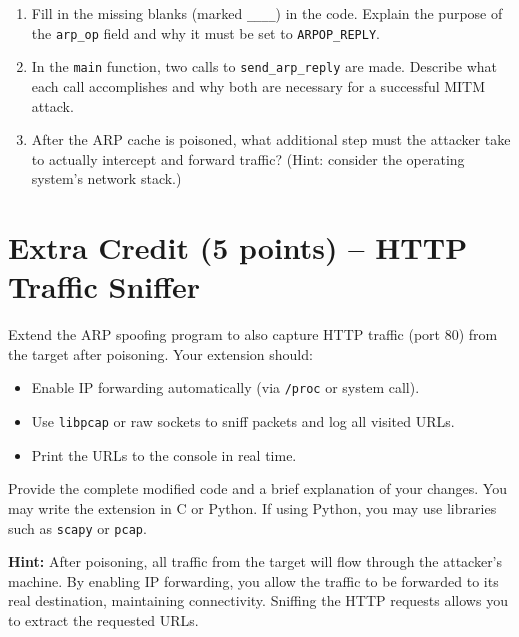 \documentclass[11pt]{article}
\begin{document}
\begin{enumerate}[label=(\alph*)]
    \item Fill in the missing blanks (marked \texttt{\_\_\_\_}) in the code. Explain the purpose of the \texttt{arp\_op} field and why it must be set to \texttt{ARPOP\_REPLY}.

    \item In the \texttt{main} function, two calls to \texttt{send\_arp\_reply} are made. Describe what each call accomplishes and why both are necessary for a successful MITM attack.

    \item After the ARP cache is poisoned, what additional step must the attacker take to actually intercept and forward traffic? (Hint: consider the operating system's network stack.)
\end{enumerate}

\newpage
\section*{Extra Credit (5 points) – HTTP Traffic Sniffer}

Extend the ARP spoofing program to also capture HTTP traffic (port 80) from the target after poisoning. Your extension should:

\begin{itemize}
    \item Enable IP forwarding automatically (via \texttt{/proc} or system call).
    \item Use \texttt{libpcap} or raw sockets to sniff packets and log all visited URLs.
    \item Print the URLs to the console in real time.
\end{itemize}

Provide the complete modified code and a brief explanation of your changes. You may write the extension in C or Python. If using Python, you may use libraries such as \texttt{scapy} or \texttt{pcap}.

\textbf{Hint:} After poisoning, all traffic from the target will flow through the attacker's machine. By enabling IP forwarding, you allow the traffic to be forwarded to its real destination, maintaining connectivity. Sniffing the HTTP requests allows you to extract the requested URLs.
\end{document}
